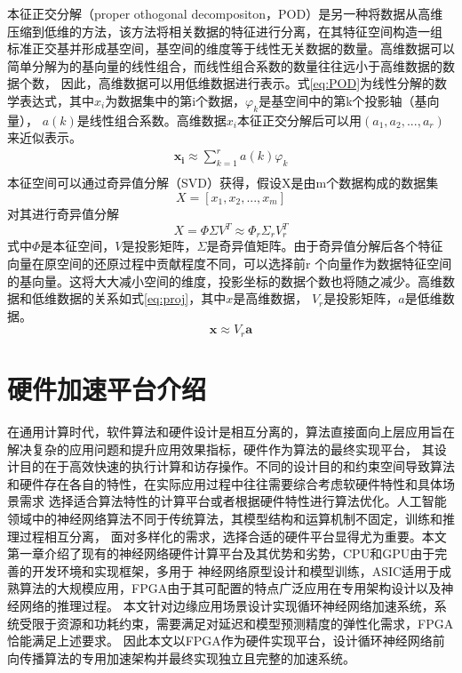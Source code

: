 本征正交分解（proper othogonal decompositon，POD）是另一种将数据从高维压缩到低维的方法，该方法将相关数据的特征进行分离，在其特征空间构造一组
标准正交基并形成基空间，基空间的维度等于线性无关数据的数量。高维数据可以简单分解为的基向量的线性组合，而线性组合系数的数量往往远小于高维数据的数据个数，
因此，高维数据可以用低维数据进行表示。式\ref{eq:POD}为线性分解的数学表达式，其中\(x_i\)为数据集中的第i个数据，\(\varphi _k\)是基空间中的第k个投影轴（基向量），
\(a(k)\)是线性组合系数。高维数据\(x_i\)本征正交分解后可以用\((a_1,a_2,...,a_r)\)来近似表示。
\begin{equation}\label{eq:POD}
	\begin{split}
		\mathbf{x_i} \approx \sum_{k=1}^{r}a(k) \varphi _k		\\
	\end{split}
\end{equation}
本征空间可以通过奇异值分解（SVD）获得，假设X是由m个数据构成的数据集
\begin{equation}
	X = [x_1,x_2,...,x_m]
\end{equation}
对其进行奇异值分解
\begin{equation}
	X = \Phi   \Sigma  V^T \approx \Phi _r  \Sigma _r  V_r^T
\end{equation}
式中\(\Phi\)是本征空间，\(V\)是投影矩阵，\(\Sigma\)是奇异值矩阵。由于奇异值分解后各个特征向量在原空间的还原过程中贡献程度不同，可以选择前r
个向量作为数据特征空间的基向量。这将大大减小空间的维度，投影坐标的数据个数也将随之减少。高维数据和低维数据的关系如式\ref{eq:proj}，其中\(x\)是高维数据，
\(V_r\)是投影矩阵，\(a\)是低维数据。
\begin{equation}\label{eq:proj}
	\mathbf{x} \approx V_r  \mathbf{a}
\end{equation}

\section{硬件加速平台介绍}
在通用计算时代，软件算法和硬件设计是相互分离的，算法直接面向上层应用旨在解决复杂的应用问题和提升应用效果指标，硬件作为算法的最终实现平台，
其设计目的在于高效快速的执行计算和访存操作。不同的设计目的和约束空间导致算法和硬件存在各自的特性，在实际应用过程中往往需要综合考虑软硬件特性和具体场景需求
选择适合算法特性的计算平台或者根据硬件特性进行算法优化。人工智能领域中的神经网络算法不同于传统算法，其模型结构和运算机制不固定，训练和推理过程相互分离，
面对多样化的需求，选择合适的硬件平台显得尤为重要。本文第一章介绍了现有的神经网络硬件计算平台及其优势和劣势，CPU和GPU由于完善的开发环境和实现框架，多用于
神经网络原型设计和模型训练，ASIC适用于成熟算法的大规模应用，FPGA由于其可配置的特点广泛应用在专用架构设计以及神经网络的推理过程。
本文针对边缘应用场景设计实现循环神经网络加速系统，系统受限于资源和功耗约束，需要满足对延迟和模型预测精度的弹性化需求，FPGA恰能满足上述要求。
因此本文以FPGA作为硬件实现平台，设计循环神经网络前向传播算法的专用加速架构并最终实现独立且完整的加速系统。

